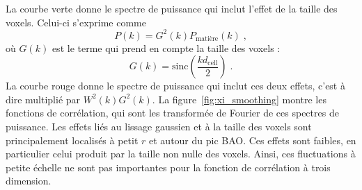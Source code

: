   La courbe verte donne le spectre de puissance qui inclut l'effet de la taille des voxels. Celui-ci s'exprime comme
  \begin{equation}
    P(k) =   G^2(k) P_{\mathrm{matière}}(k) \; ,
  \end{equation}
  où $G(k)$ est le terme qui prend en compte la taille des voxels :
  \begin{equation}
    \label{eq:effet_reso}
    G(k) = \mathrm{sinc}\left(\frac{k d_{\mathrm{cell}}}{2}\right)  \; .
  \end{equation}
  La courbe rouge donne le spectre de puissance qui inclut ces deux effets, c'est à dire multiplié par $W^2(k)G^2(k)$.
  La figure~\ref{fig:xi_smoothing} montre les fonctions de corrélation, qui sont les transformée de Fourier de ces spectres de puissance.
  Les effets liés au lissage gaussien et à la taille des voxels sont principalement localisés à petit $r$ et autour du pic BAO. Ces effets sont faibles, en particulier celui produit par la taille non nulle des voxels.
  Ainsi, ces fluctuations à petite échelle ne sont pas importantes pour la fonction de corrélation à trois dimension.

